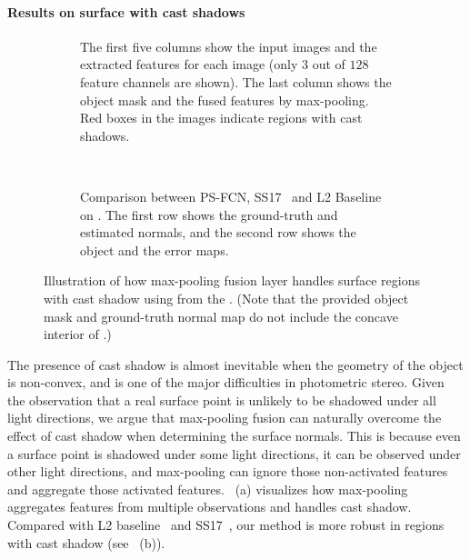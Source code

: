 \paragraph{Results on surface with cast shadows} 
\begin{figure}[htbp] \centering
    \begin{subfigure}[t]{0.9\textwidth}
        \vspace{-1.5em}
        \caption{The first five columns show the input images and the extracted features for each image (only $3$ out of $128$ feature channels are shown). The last column shows the object mask and the fused features by max-pooling. Red boxes in the images indicate regions with cast shadows.} \label{fig:visual_cast_shadow}
    \end{subfigure} \\ \vspace{1em}
    \begin{subfigure}[t]{0.8\textwidth}
        
        \caption{Comparison between PS-FCN, SS17~\cite{santo2017deep} and L2 Baseline~\cite{woodham1980ps} on . The first row shows the ground-truth and estimated normals, and the second row shows the object and the error maps.} \label{fig:compare_cast_shadow} %
    \end{subfigure}
    \caption[Illustration of how max-pooling fusion layer handles cast shadow]{Illustration of how max-pooling fusion layer handles surface regions with cast shadow using  from the \diligent. (Note that the provided object mask and ground-truth normal map do not include the concave interior of .)} \label{fig:cast_shadow}
\end{figure}

The presence of cast shadow is almost inevitable when the geometry of the object is non-convex, and is one of the major difficulties in photometric stereo.
Given the observation that a real surface point is unlikely to be shadowed under all light directions, we argue that max-pooling fusion can naturally overcome the effect of cast shadow when determining the surface normals.
This is because even a surface point is shadowed under some light directions, it can be observed under other light directions, and max-pooling can ignore those non-activated features and aggregate those activated features. 
~(a) visualizes how max-pooling aggregates features from multiple observations and handles cast shadow. Compared with L2 baseline~\cite{woodham1980ps} and SS17~\cite{santo2017deep}, our method is more robust in regions with cast shadow (see ~(b)).


